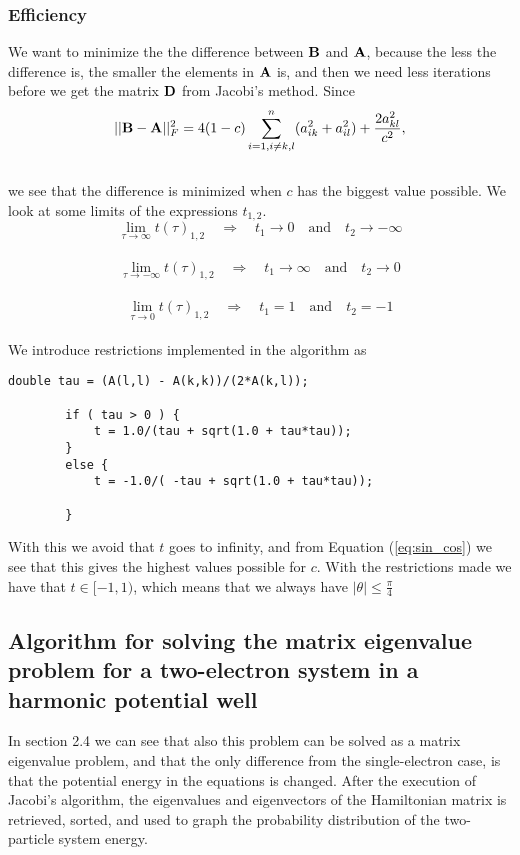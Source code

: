 \documentclass[12pt]{article}
\begin{document}
\begin{flushleft}
\subsubsection{Efficiency}
We want to minimize the the difference between $\bf B$ and $\bf A$, because the less the difference is, the smaller the elements in $\bf A$ is, and then we need less iterations before we get the matrix $\bf D$ from Jacobi's method. Since\\
\vspace{5mm}
$$||{\bf B}-{\bf A}||_F^2=4(1-c)\sum_{i=1,i\ne k,l}^n(a_{ik}^2+a_{il}^2) +\frac{2a_{kl}^2}{c^2},$$\\   
\vspace{5mm}
we see that the difference is minimized when $c$ has the biggest value possible. We look at some limits of the expressions $t_{1,2}$.
\newpage
$$\lim_{\tau\to\infty}t(\tau)_{1,2} \quad\Rightarrow\quad t_{1} \to 0\quad\text{and}\quad t_2 \to -\infty $$\\
$$\lim_{\tau\to-\infty}t(\tau)_{1,2} \quad\Rightarrow\quad t_{1} \to \infty\quad\text{and}\quad t_2 \to 0$$\\
$$\lim_{\tau\to 0}t(\tau)_{1,2} \quad\Rightarrow\quad t_{1} = 1\quad\text{and}\quad t_2 = -1$$\\
\vspace{5mm}
We introduce restrictions implemented in the algorithm as\\
\vspace{5mm}

\begin{center}
  \lstset{%
    basicstyle=\ttfamily\footnotesize\bfseries,
    frame=tb
  }
\begin{lstlisting}[label={lst:fwrd_bkwrd}]
double tau = (A(l,l) - A(k,k))/(2*A(k,l)); 

		if ( tau > 0 ) {
    		t = 1.0/(tau + sqrt(1.0 + tau*tau));
		} 
		else {
			t = -1.0/( -tau + sqrt(1.0 + tau*tau));

		}
\end{lstlisting}
\end{center}

\vspace{5mm}
With this we avoid that $t$ goes to infinity, and from Equation (\ref{eq:sin_cos}) we see that this gives the highest values possible for $c$. With the restrictions made we have that $t\in [-1,1)$, which means that we always have $|\theta|\leq\frac{\pi}{4}$

\subsection{Algorithm for solving the matrix eigenvalue problem for a two-electron system in a harmonic potential well}
In section 2.4 we can see that also this problem can be solved as a matrix eigenvalue problem, and that the only difference from the single-electron case, is that the potential energy in the equations is changed. After the execution of Jacobi's algorithm, the eigenvalues and eigenvectors of the Hamiltonian matrix is retrieved, sorted, and used to graph the probability distribution of the two-particle system energy.


\end{flushleft}
\end{document}
